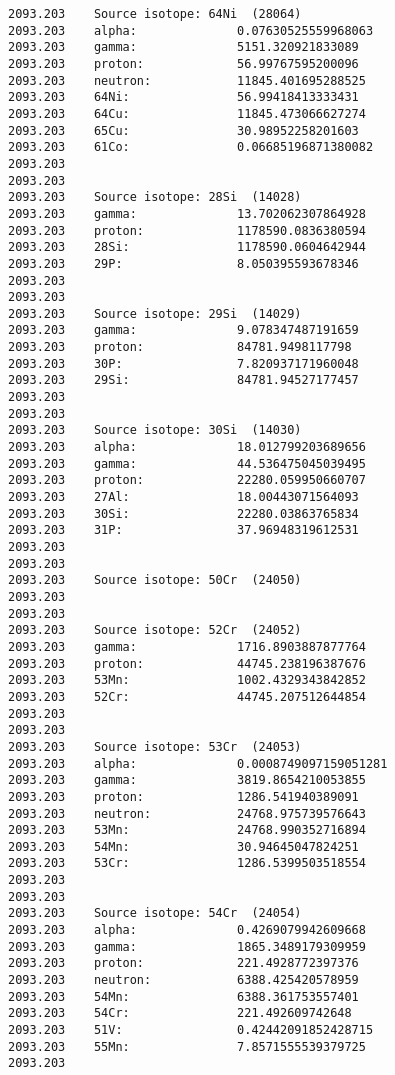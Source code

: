 \begin{lstlisting}[style=sOutputFile,caption={Final results for steel irradiation},label={listing:alexsteel}]
2093.203    Source isotope: 64Ni  (28064)
2093.203    alpha:              0.07630525559968063
2093.203    gamma:              5151.320921833089
2093.203    proton:             56.99767595200096
2093.203    neutron:            11845.401695288525
2093.203    64Ni:               56.99418413333431
2093.203    64Cu:               11845.473066627274
2093.203    65Cu:               30.98952258201603
2093.203    61Co:               0.06685196871380082
2093.203    
2093.203    
2093.203    Source isotope: 28Si  (14028)
2093.203    gamma:              13.702062307864928
2093.203    proton:             1178590.0836380594
2093.203    28Si:               1178590.0604642944
2093.203    29P:                8.050395593678346
2093.203    
2093.203    
2093.203    Source isotope: 29Si  (14029)
2093.203    gamma:              9.078347487191659
2093.203    proton:             84781.9498117798
2093.203    30P:                7.820937171960048
2093.203    29Si:               84781.94527177457
2093.203    
2093.203    
2093.203    Source isotope: 30Si  (14030)
2093.203    alpha:              18.012799203689656
2093.203    gamma:              44.536475045039495
2093.203    proton:             22280.059950660707
2093.203    27Al:               18.00443071564093
2093.203    30Si:               22280.03863765834
2093.203    31P:                37.96948319612531
2093.203    
2093.203    
2093.203    Source isotope: 50Cr  (24050)
2093.203    
2093.203    
2093.203    Source isotope: 52Cr  (24052)
2093.203    gamma:              1716.8903887877764
2093.203    proton:             44745.238196387676
2093.203    53Mn:               1002.4329343842852
2093.203    52Cr:               44745.207512644854
2093.203    
2093.203    
2093.203    Source isotope: 53Cr  (24053)
2093.203    alpha:              0.0008749097159051281
2093.203    gamma:              3819.8654210053855
2093.203    proton:             1286.541940389091
2093.203    neutron:            24768.975739576643
2093.203    53Mn:               24768.990352716894
2093.203    54Mn:               30.94645047824251
2093.203    53Cr:               1286.5399503518554
2093.203    
2093.203    
2093.203    Source isotope: 54Cr  (24054)
2093.203    alpha:              0.4269079942609668
2093.203    gamma:              1865.3489179309959
2093.203    proton:             221.4928772397376
2093.203    neutron:            6388.425420578959
2093.203    54Mn:               6388.361753557401
2093.203    54Cr:               221.492609742648
2093.203    51V:                0.42442091852428715
2093.203    55Mn:               7.8571555539379725
2093.203    

\end{lstlisting}
